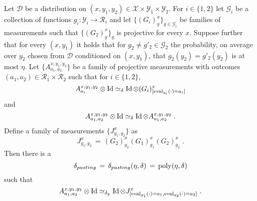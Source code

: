 \begin{lemma}\label{lem:pasting}
Let $\mathcal{D}$ be a distribution on $(x,y_1,y_2)\in \mathcal{X}\times \mathcal{Y}_1\times \mathcal{Y}_2$. For $i\in \{1,2\}$ let $\mathcal{G}_i$ be a collection of functions $g_i: \mathcal{Y}_i \to \mathcal{R}_i$ and let $\{(G_i)^{x}_{g}\}_{g\in \mathcal{G}_i}$ be families of measurements such that $\{(G_2)^x_g\}_g$ is projective for every $x$. Suppose further that for every $(x,y_1)$ it holds that for $g_2\neq g'_2 \in \mathcal{G}_2$ the probability, on average over $y_2$ chosen from $\mathcal{D}$ conditioned on $(x,y_1)$, that $g_2(y_2)=g'_2(y_2)$  is at most $\eta$. 
Let $\{A^{x,y_1,y_2}_{a_1,a_2}\}$ be a family of projective measurements with outcomes $(a_1,a_2)\in \mathcal{R}_1 \times \mathcal{R}_2$ such that for $i\in \{1,2\}$,
\begin{equation}\label{eq:pasting-1}
 A^{x,y_1,y_2}_{a_i} \otimes \mathop{\rm Id}\nolimits \simeq_\delta \mathop{\rm Id}\nolimits \otimes (G_i)^x_{[\mathrm{eval}_{y_i}(\cdot)=a_i]}
\end{equation}
and 
\begin{equation}\label{eq:pasting-2}
 A^{x,y_1,y_2}_{a_1,a_2} \otimes \mathop{\rm Id}\nolimits \simeq_\delta \mathop{\rm Id}\nolimits \otimes  A^{x,y_1,y_2}_{a_1,a_2}\;.
\end{equation}
Define a family of measurements $\{J^x_{g_1,g_2}\}$ as
\begin{equation}\label{eq:pasting-2a}
 J^x_{g_1,g_2} \,=\, (G_2)^x_{g_2} (G_1)^x_{g_1} (G_2)^x_{g_2}\;.
\end{equation}
Then there is a 
\begin{equation}\label{eq:def-deltap}
\delta_{pasting} \,=\, \delta_{pasting}(\eta,\delta)\,=\, \mathrm{poly}(\eta,\delta)
\end{equation} such that 
\begin{equation}\label{eq:pasting-3}
 A^{x,y_1,y_2}_{a_1,a_2} \otimes \mathop{\rm Id}\nolimits \simeq_{\delta_p} \mathop{\rm Id}\nolimits \otimes J^x_{[\mathrm{eval}_{y_1}(\cdot)=a_1,\mathrm{eval}_{y_2}(\cdot) = a_2]}\;.
\end{equation}
\end{lemma}
%
%


